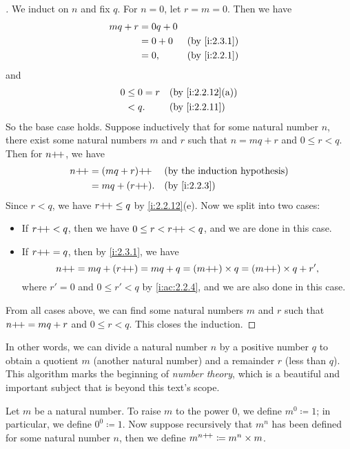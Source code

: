 \begin{proof}[]
  We induct on \(n\) and fix \(q\).
  For \(n = 0\), let \(r = m = 0\).
  Then we have
  \begin{align*}
    mq + r & = 0q + 0                   \\
           & = 0 + 0  &  & \by{i:2.3.1} \\
           & = 0,     &  & \by{i:2.2.1}
  \end{align*}
  and
  \begin{align*}
    0 & \leq 0 = r &  & \by{i:2.2.12}[a] \\
      & < q.       &  & \by{i:2.2.11}
  \end{align*}
  So the base case holds.
  Suppose inductively that for some natural number \(n\), there exist some natural numbers \(m\) and \(r\) such that \(n = mq + r\) and \(0 \leq r < q\).
  Then for \(n{+}\!{+}\), we have
  \begin{align*}
    n\pp & = (mq + r)\pp  &  & \byIH        \\
         & = mq + (r\pp). &  & \by{i:2.2.3} \\
  \end{align*}
  Since \(r < q\), we have \(r{+}\!{+} \leq q\) by \cref{i:2.2.12}(e).
  Now we split into two cases:
  \begin{itemize}
    \item If \(r{+}\!{+} < q\), then we have \(0 \leq r < r{+}\!{+} < q\), and we are done in this case.
    \item If \(r{+}\!{+} = q\), then by \cref{i:2.3.1}, we have
          \[
            n{+}\!{+} = mq + (r{+}\!{+}) = mq + q = (m{+}\!{+}) \times q = (m{+}\!{+}) \times q + r',
          \]
          where \(r' = 0\) and \(0 \leq r' < q\) by \cref{i:ac:2.2.4}, and we are also done in this case.
  \end{itemize}
  From all cases above, we can find some natural numbers \(m\) and \(r\) such that \(n{+}\!{+} = mq + r\) and \(0 \leq r < q\).
  This closes the induction.
\end{proof}

\begin{rmk}\label{i:2.3.10}
  In other words, we can divide a natural number \(n\) by a positive number \(q\) to obtain a quotient \(m\) (another natural number) and a remainder \(r\) (less than \(q\)).
  This algorithm marks the beginning of \emph{number theory}, which is a beautiful and important subject that is beyond this text's scope.
\end{rmk}

\begin{defn}\label{i:2.3.11}
  Let \(m\) be a natural number.
  To raise \(m\) to the power \(0\), we define \(m^0 \coloneqq 1\); in particular, we define \(0^0 \coloneqq 1\).
  Now suppose recursively that \(m^n\) has been defined for some natural number \(n\), then we define \(m^{n{+}\!{+}} \coloneqq m^n \times m\).
\end{defn}

